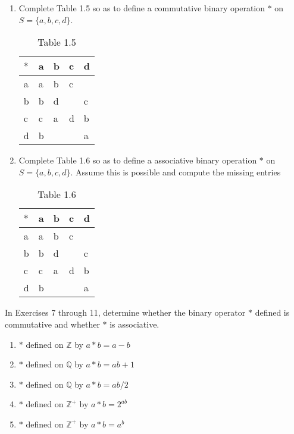 \documentclass[10pt,letterpaper]{article}
\begin{document}
  \begin{enumerate}[resume]
    \item Complete Table 1.5 so as to define a commutative binary operation $\ast $ on $S=\{a,b,c,d\}$. \\
    \begin{table}[h]
      \begin{center}
        \captionsetup{labelformat=empty}
        \caption{Table 1.5}
        \begin{tabular}{l|l|l|l|l} 
          $\ast$ & a & b & c & d \\
          \hline
          a & a & b & c &  \\
          \hline
          b & b & d &  & c \\
          \hline
          c & c & a & d & b \\
          \hline
          d & b &  &  & a
        \end{tabular}
      \end{center}
    \end{table}
    \item Complete Table 1.6 so as to define a associative binary operation $\ast $ on $S=\{a,b,c,d\}$. 
          Assume this is possible and compute the missing entries\\
    \begin{table}[h]
      \begin{center}
        \captionsetup{labelformat=empty}
        \caption{Table 1.6}
        \begin{tabular}{l|l|l|l|l} 
          $\ast$ & a & b & c & d \\
          \hline
          a & a & b & c &  \\
          \hline
          b & b & d &  & c \\
          \hline
          c & c & a & d & b \\
          \hline
          d & b &  &  & a
        \end{tabular}
      \end{center}
    \end{table}
  \end{enumerate}

  In Exercises 7 through 11, determine whether the binary operator $\ast$ defined is commutative and whether $\ast$ is associative.
  \begin{enumerate}[resume]
    \item $\ast$ defined on $\mathbb{Z}$ by $a \ast b = a-b$
    \item $\ast$ defined on $\mathbb{Q}$ by $a \ast b = ab+1$
    \item $\ast$ defined on $\mathbb{Q}$ by $a \ast b = ab/2$
    \item $\ast$ defined on $\mathbb{Z}^+$ by $a \ast b = 2^{ab}$
    \item $\ast$ defined on $\mathbb{Z}^+$ by $a \ast b = a^b$
  \end{enumerate}
\end{document}
